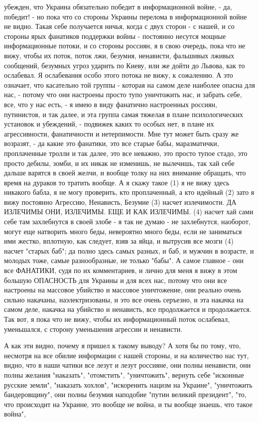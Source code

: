 убежден, что Украина обязательно победит в информационной войне, - да, победит!
- но пока что со стороны Украины перелома в информационной войне не видно.
Такая себе получается ничья, когда с двух сторон - с нашей, и со стороны ярых
фанатиков поддержки войны - постоянно несутся мощные информационные потоки, и
со стороны россиян, я в свою очередь, пока что не вижу, чтобы их поток, поток
лжи, безумия, ненависти, фальшивых лживых сообщений, безумных угроз ударить по
Киеву, или же дойти до Львова, как то ослабевал. Я ослабевания особо этого
потока не вижу, к сожалению.  А это означает, что касательно той группы -
которая на самом деле наиболее опасна для нас, - потому что они настроены
просто тупо уничтожить нас, и забрать себе, все, что у нас есть, - я имею в
виду фанатично настроенных россиян, путинистов, и так далее, и эта группа самая
тяжелая в плане психологических установок и убеждений, - подвижек каких то
особых нет, в плане их агрессивности,
фанатичности и нетерпимости. Мне тут может быть сразу же возразят, - да какие
это фанатики, это все старые бабы, маразматички, проплаченные тролли и так
далее, это все неважно, это просто тупое стадо, это просто дебилы, зомби, и их
никак не изменишь, не вылечишь, так хай себе дальше варятся в своей желчи, и
вообще толку на них внимание обращать, что время на дураков то тратить вообще.
А я скажу такое (1) я не вижу здесь никакого бабла, я не могу проверить, кто
проплаченный, а кто идейный (2) зато я вижу постоянно Агрессию, Ненависть,
Безумие (3) насчет излечимости. ДА ИЗЛЕЧИМЫ ОНИ, ИЗЛЕЧИМЫ. ЕЩЕ И КАК ИЗЛЕЧИМЫ.
(4) насчет хай сами себе там захлебнутся в своей злобе - я так не думаю - не
захлебнутся, наоборот, могут еще натворить много беды, невероятно много беды,
если не заниматься ими жестко, вплотную, как следует, взяв за яйца, и вытрусив
все мозги (4) насчет "старых баб"; да полно здесь самых разных, и баб, и мужчин
в возрасте, и молодых тоже, самые разнообразные, не только "бабы". А самое
главное - они все ФАНАТИКИ, судя по их комментариев, и лично для меня я вижу в
этом большую ОПАСНОСТЬ для Украины и для всех нас, потому что они все настроены
на массовое убийство и массовое уничтожение, они реально очень сильно накачаны,
наэлектризованы, и это все очень серъезно, и эта накачка на самом деле, накачка
на убийство и ненависть, все продолжается и продолжается. Так вот, я пока что
не вижу, чтобы их информационный поток ослабевал, уменьшался, с сторону
уменьшения агрессии и ненависти.

А как эти видно, почему я пришел к такому выводу? А хотя бы по тому, что,
несмотря на все обилие информации с нашей стороны, и на количество нас тут,
видно, что в наши чатики все лезут и лезут россияне, они полны ненависти, они
полны желания "наказать", "отомстить", "уничтожить", вернуть себе "исконные
русские земли", "наказать хохлов", "искоренить нацизм на Украине", "уничтожить
бандеровщину", они полны безумия наподобие "путин великий президент", "то, что
происходит на Украине, это вообще не война, и ты вообще знаешь, что такое
война", 
